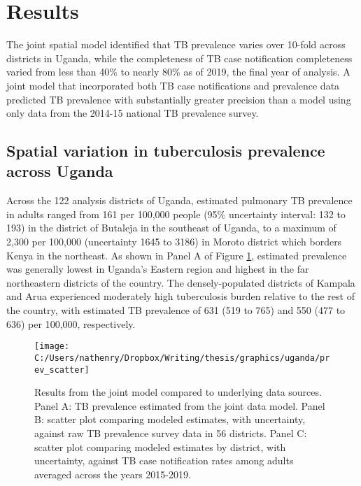 \documentclass[
]{article}
\begin{document}
\hypertarget{results}{%
\section{Results}\label{results}}

The joint spatial model identified that TB prevalence varies over 10-fold across districts in Uganda, while the completeness of TB case notification completeness varied from less than 40\% to nearly 80\% as of 2019, the final year of analysis. A joint model that incorporated both TB case notifications and prevalence data predicted TB prevalence with substantially greater precision than a model using only data from the 2014-15 national TB prevalence survey.

\hypertarget{spatial-variation-in-tuberculosis-prevalence-across-uganda}{%
\subsection{Spatial variation in tuberculosis prevalence across Uganda}\label{spatial-variation-in-tuberculosis-prevalence-across-uganda}}

Across the 122 analysis districts of Uganda, estimated pulmonary TB prevalence in adults ranged from 161 per 100,000 people (95\% uncertainty interval: 132 to 193) in the district of Butaleja in the southeast of Uganda, to a maximum of 2,300 per 100,000 (uncertainty 1645 to 3186) in Moroto district which borders Kenya in the northeast. As shown in Panel A of Figure \ref{fig:prev-scatter}, estimated prevalence was generally lowest in Uganda's Eastern region and highest in the far northeastern districts of the country. The densely-populated districts of Kampala and Arua experienced moderately high tuberculosis burden relative to the rest of the country, with estimated TB prevalence of 631 (519 to 765) and 550 (477 to 636) per 100,000, respectively.

\begin{figure}[!ht]

{\centering \texttt{[image: C:/Users/nathenry/Dropbox/Writing/thesis/graphics/uganda/prev\_scatter]} 

}

\caption{Results from the joint model compared to underlying data sources. Panel A: TB prevalence estimated from the joint data model. Panel B: scatter plot comparing modeled estimates, with uncertainty, against raw TB prevalence survey data in 56 districts. Panel C: scatter plot comparing modeled estimates by district, with uncertainty, against TB case notification rates among adults averaged across the years 2015-2019.}\label{fig:prev-scatter}
\end{figure}
\end{document}
